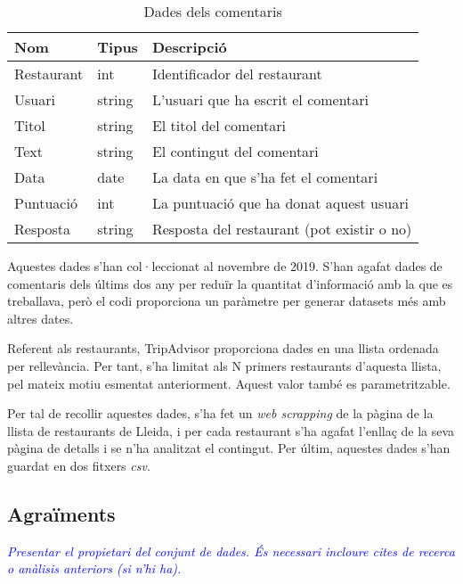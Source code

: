 \documentclass{article}
\newcommand\enunciat[2][blue]{\textcolor{#1}{\emph{#2}}}
\begin{document}
\begin{table}[h]
	\centering
    \begin{tabular}{|p{}|p{}|p{}|}
		\hline
        Nom        & Tipus  & Descripció \\\hline\hline
        Restaurant & int    & Identificador del restaurant\\\hline
        Usuari     & string & L'usuari que ha escrit el comentari \\\hline
        Titol      & string & El titol del comentari \\\hline
        Text       & string & El contingut del comentari \\\hline
        Data       & date   & La data en que s'ha fet el comentari \\\hline
        Puntuació  & int    & La puntuació que ha donat aquest usuari \\\hline
        Resposta   & string & Resposta del restaurant (pot existir o no)
							  \\\hline
    \end{tabular}
    \caption{Dades dels comentaris}
    \label{table:dataset2_data}
\end{table}

Aquestes dades s'han col·leccionat al novembre de 2019. S'han agafat dades de
comentaris dels últims dos any per reduïr la quantitat d'informació amb la que
es treballava, però el codi proporciona un paràmetre per generar datasets més
amb altres dates.

Referent als restaurants, TripAdvisor proporciona dades en una llista ordenada
per rellevància. Per tant, s'ha limitat als N primers restaurants d'aquesta %
llista, pel mateix motiu esmentat anteriorment. Aquest valor també es
parametritzable.
\linebreak

Per tal de recollir aquestes dades, s'ha fet un \textit{web scrapping} de la
pàgina de la llista de restaurants de Lleida, i per cada restaurant s'ha agafat
l'enllaç de la seva pàgina de detalls i se n'ha analitzat el contingut. Per
últim, aquestes dades s'han guardat en dos fitxers \textit{csv}.

\subsection{Agraïments}
\enunciat{Presentar el propietari del conjunt de dades. És necessari incloure
cites de recerca o anàlisis anteriors (si n'hi ha).}
\end{document}
